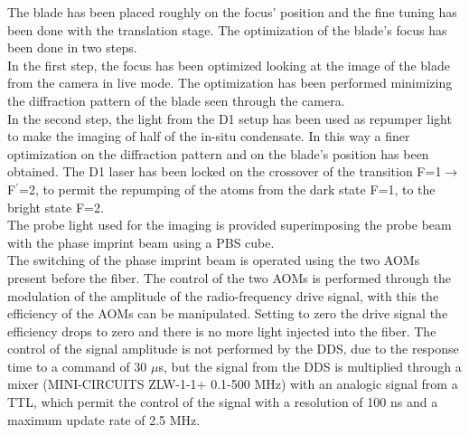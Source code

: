 \documentclass[../thesis.tex]{subfiles}
\begin{document}
The blade has been placed roughly on the focus' position and the fine tuning has been done with the translation stage. The optimization of the blade's focus has been done in two steps.\\
In the first step, the focus has been optimized looking at the image of the blade from the camera in live mode. The optimization has been performed minimizing the diffraction pattern of the blade seen through the camera.\\
In the second step, the light from the D1 setup has been used as repumper light to make the imaging of half of the in-situ condensate. In this way a finer optimization on the diffraction pattern and on the blade's position has been obtained. The D1 laser has been locked on the crossover of the transition F=1$\rightarrow$F$^\prime$=2, to permit the repumping of the atoms from the dark state F=1, to the bright state F=2.\\
The probe light used for the imaging is provided superimposing the probe beam with the phase imprint beam using a PBS cube.\\

The switching of the phase imprint beam is operated using the two AOMs present before the fiber. The control of the two AOMs is performed through the modulation of the amplitude of the radio-frequency drive signal, with this the efficiency of the AOMs can be manipulated. Setting to zero the drive signal the efficiency drops to zero and there is no more light injected into the fiber. The control of the signal amplitude is not performed by the DDS, due to the response time to a command of 30 $\mu$s, but the signal from the DDS is multiplied through a mixer (MINI-CIRCUITS ZLW-1-1+ 0.1-500 MHz) with an analogic signal from a TTL, which permit the control of the signal with a resolution of 100 ns and a maximum update rate of 2.5 MHz.\\
\end{document}

